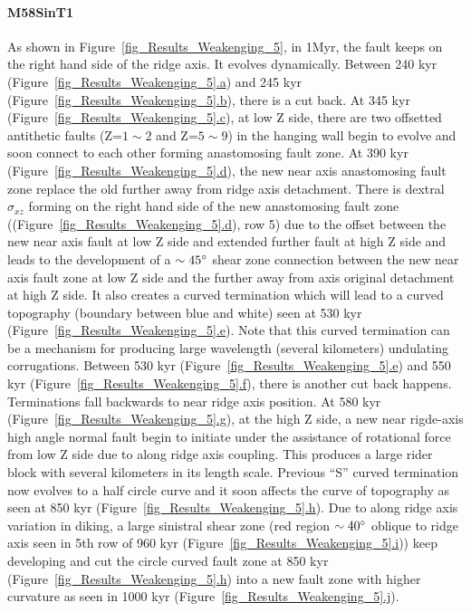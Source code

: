 \paragraph{M58SinT1}\label{para_M58SinT1}

As shown in Figure~\hyperref[fig_Results_Weakenging_5]{\ref{fig_Results_Weakenging_5}}, in 1Myr, the fault keeps on the right hand side of the ridge axis. It evolves dynamically. Between 240 kyr (Figure~\hyperref[fig_Results_Weakenging_5]{\ref{fig_Results_Weakenging_5}.a}) and 245 kyr (Figure~\hyperref[fig_Results_Weakenging_5]{\ref{fig_Results_Weakenging_5}.b}), there is a cut back. At 345 kyr (Figure~\hyperref[fig_Results_Weakenging_5]{\ref{fig_Results_Weakenging_5}.c}), at low Z side, there are two offsetted antithetic faults (Z=$1\sim2$ and Z=$5\sim9$) in the hanging wall begin to evolve and soon connect to each other forming anastomosing fault zone. At 390 kyr (Figure~\hyperref[fig_Results_Weakenging_5]{\ref{fig_Results_Weakenging_5}.d}), the new near axis anastomosing fault zone replace the old further away from ridge axis detachment. There is dextral $\sigma_{xz}$ forming on the right hand side of the new anastomosing fault zone ((Figure~\hyperref[fig_Results_Weakenging_5]{\ref{fig_Results_Weakenging_5}.d}), row 5) due to the offset between the new near axis fault at low Z side and extended further fault at high Z side and leads to the development of a $\sim45\degree$ shear zone connection between the new near axis fault zone at low Z side and the further away from axis original detachment at high Z side. It also creates a curved termination which will lead to a curved topography (boundary between blue and white) seen at 530 kyr (Figure~\hyperref[fig_Results_Weakenging_5]{\ref{fig_Results_Weakenging_5}.e}). Note that this curved termination can be a mechanism for producing large wavelength (several kilometers) undulating corrugations. Between 530 kyr (Figure~\hyperref[fig_Results_Weakenging_5]{\ref{fig_Results_Weakenging_5}.e}) and 550 kyr (Figure~\hyperref[fig_Results_Weakenging_5]{\ref{fig_Results_Weakenging_5}.f}), there is another cut back happens. Terminations fall backwards to near ridge axis position. At 580 kyr (Figure~\hyperref[fig_Results_Weakenging_5]{\ref{fig_Results_Weakenging_5}.g}), at the high Z side, a new near rigde-axis high angle normal fault begin to initiate under the assistance of rotational force from low Z side due to along ridge axis coupling. This produces a large rider block with several kilometers in its length scale. Previous ``S'' curved termination now evolves to a half circle curve and it soon affects the curve of topography as seen at 850 kyr (Figure~\hyperref[fig_Results_Weakenging_5]{\ref{fig_Results_Weakenging_5}.h}). Due to along ridge axis variation in diking, a large sinistral shear zone (red region $\sim40\degree$ oblique to ridge axis seen in 5th row of 960 kyr (Figure~\hyperref[fig_Results_Weakenging_5]{\ref{fig_Results_Weakenging_5}.i})) keep developing and cut the circle curved fault zone at 850 kyr (Figure~\hyperref[fig_Results_Weakenging_5]{\ref{fig_Results_Weakenging_5}.h}) into a new fault zone with higher curvature as seen in 1000 kyr (Figure~\hyperref[fig_Results_Weakenging_5]{\ref{fig_Results_Weakenging_5}.j}).         

